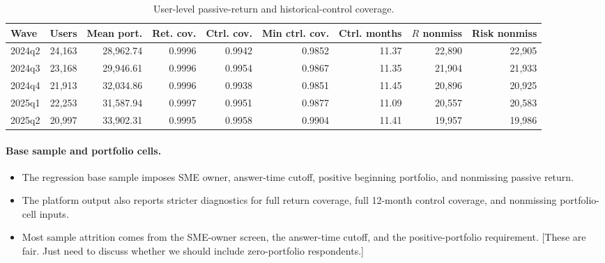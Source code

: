 \documentclass[11pt,letterpaper,english,final]{article}
\begin{document}
\begin{table}[H]
\centering
\small
\setlength{\tabcolsep}{4pt}
\caption{User-level passive-return and historical-control coverage.}
\label{tab:rf_user_shock_control_20260901}
\begin{tabular}{lrrrrrrrr}
\toprule
Wave & Users & Mean port. & Ret. cov. & Ctrl. cov. & Min ctrl. cov. & Ctrl. months & $R$ nonmiss & Risk nonmiss \\
\midrule
2024q2 & 24{,}163 & 28{,}962.74 & 0.9996 & 0.9942 & 0.9852 & 11.37 & 22{,}890 & 22{,}905 \\
2024q3 & 23{,}168 & 29{,}946.61 & 0.9996 & 0.9954 & 0.9867 & 11.35 & 21{,}904 & 21{,}933 \\
2024q4 & 21{,}913 & 32{,}034.86 & 0.9996 & 0.9938 & 0.9851 & 11.45 & 20{,}896 & 20{,}925 \\
2025q1 & 22{,}253 & 31{,}587.94 & 0.9997 & 0.9951 & 0.9877 & 11.09 & 20{,}557 & 20{,}583 \\
2025q2 & 20{,}997 & 33{,}902.31 & 0.9995 & 0.9958 & 0.9904 & 11.41 & 19{,}957 & 19{,}986 \\
\bottomrule
\end{tabular}
\end{table}

\paragraph{Base sample and portfolio cells.}

\begin{itemize}
\item The regression base sample imposes SME owner, answer-time cutoff, positive beginning portfolio, and nonmissing passive return.
\item The platform output also reports stricter diagnostics for full return coverage, full 12-month control coverage, and nonmissing portfolio-cell inputs.
\item Most sample attrition comes from the SME-owner screen, the answer-time cutoff, and the positive-portfolio requirement. {\color{cyan} [These are fair. Just need to discuss whether we should include zero-portfolio respondents.]}
\end{itemize}
\end{document}
